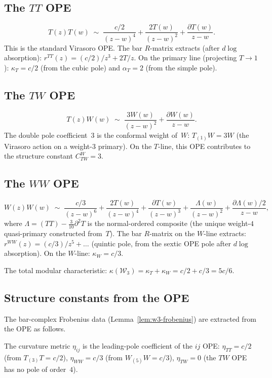 \documentclass[11pt,reqno]{amsart}
\theoremstyle{definition}
\theoremstyle{remark}
\newcommand{\cW}{\mathcal{W}}
\numberwithin{equation}{section}
\begin{document}
\subsection{The $TT$ OPE}\label{subsec:w3-TT}

\[
 T(z)T(w)
 \;\sim\;
 \frac{c/2}{(z-w)^4}
 + \frac{2T(w)}{(z-w)^2}
 + \frac{\partial T(w)}{z-w}.
\]
This is the standard Virasoro OPE. The bar $R$-matrix
extracts (after $d\!\log$ absorption):
$r^{TT}(z) = (c/2)/z^3 + 2T/z$.
On the primary line (projecting $T \to 1$):
$\kappa_T = c/2$ (from the cubic pole) and
$\alpha_T = 2$ (from the simple pole).

\subsection{The $TW$ OPE}\label{subsec:w3-TW}

\[
 T(z)W(w)
 \;\sim\;
 \frac{3W(w)}{(z-w)^2}
 + \frac{\partial W(w)}{z-w}.
\]
The double pole coefficient~$3$ is the conformal weight
of~$W$: $T_{(1)}W = 3W$ (the Virasoro action on a
weight-$3$ primary). On the $T$-line, this OPE contributes
to the structure constant $C^W_{TW} = 3$.

\subsection{The $WW$ OPE}\label{subsec:w3-WW}

\[
 W(z)W(w)
 \;\sim\;
 \frac{c/3}{(z-w)^6}
 + \frac{2T(w)}{(z-w)^4}
 + \frac{\partial T(w)}{(z-w)^3}
 + \frac{\Lambda(w)}{(z-w)^2}
 + \frac{\partial \Lambda(w)/2}{z-w},
\]
where $\Lambda = (TT) - \frac{3}{10}\partial^2 T$ is the
normal-ordered composite (the unique weight-$4$ quasi-primary
constructed from~$T$). The bar $R$-matrix on the $W$-line
extracts:
$r^{WW}(z) = (c/3)/z^5 + \ldots$
(quintic pole, from the sextic OPE pole after $d\!\log$
absorption). On the $W$-line: $\kappa_W = c/3$.

The total modular characteristic:
$\kappa(\cW_3) = \kappa_T + \kappa_W = c/2 + c/3 = 5c/6$.

\subsection{Structure constants from the
OPE}\label{subsec:w3-structure}

The bar-complex Frobenius data
(Lemma~\ref{lem:w3-frobenius}) are extracted from the OPE as
follows.

The curvature metric $\eta_{ij}$ is the leading-pole
coefficient of the $ij$ OPE: $\eta_{TT} = c/2$
(from $T_{(3)}T = c/2$), $\eta_{WW} = c/3$
(from $W_{(5)}W = c/3$), $\eta_{TW} = 0$
(the $TW$ OPE has no pole of order~$4$).
\end{document}
